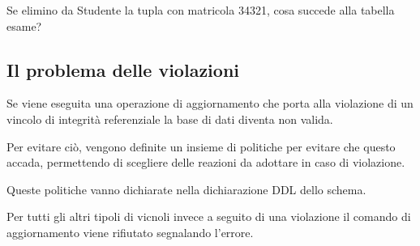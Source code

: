 Se elimino da Studente la tupla con matricola 34321, cosa succede alla tabella esame?

\subsection{Il problema delle violazioni}
Se viene eseguita una operazione di aggiornamento che porta alla violazione di un vincolo di integrità referenziale la base di dati diventa non valida.

Per evitare ciò, vengono definite un insieme di politiche per evitare che questo accada, permettendo di scegliere delle reazioni da adottare in caso di violazione.

Queste politiche vanno dichiarate nella dichiarazione DDL dello schema.

Per tutti gli altri tipoli di vicnoli invece a seguito di una violazione il comando di aggiornamento viene rifiutato segnalando l'errore.

\vspace{\baselineskip}

